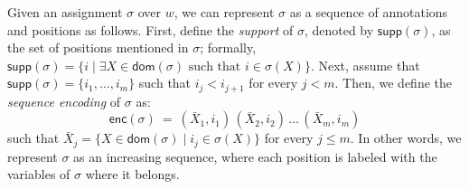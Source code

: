 Given an assignment $\sigma$ over $w$, we can represent $\sigma$ as a sequence of annotations and positions as follows. First, define the \emph{support} of $\sigma$, denoted by $\textsf{supp}(\sigma)$, as the set of positions mentioned in $\sigma$; formally, $\textsf{supp}(\sigma) = \{i \mid \exists X \in  \textsf{dom}(\sigma)\text{ such that } i \in  \sigma(X)\}$. 
Next, assume that $\textsf{supp}(\sigma) = \{i_1,\ldots, i_m\}$ such that $i_j < i_{j+1}$ for every $j < m$. 
Then, we define the \emph{sequence encoding} of $\sigma$ as:
$$
\textsf{enc}(\sigma) \ = \ (\bar{X}_1, i_1) \, (\bar{X}_2, i_2) \, \ldots \, (\bar{X}_m, i_m)
$$
such that $\bar{X}_j = \{X \in \textsf{dom}(\sigma) \mid i_j \in \sigma(X)\}$ for every $j \leq m$. 
In other words, we represent $\sigma$ as an increasing sequence, where each position is labeled with the variables of $\sigma$ where it belongs.

